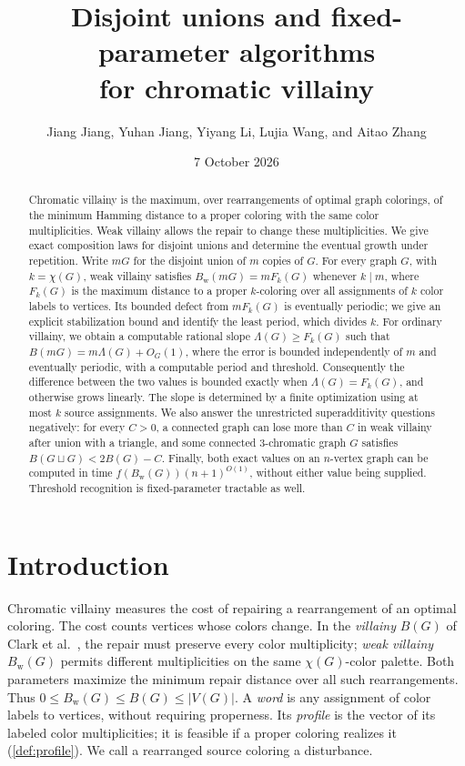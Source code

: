 \documentclass[11pt,reqno]{amsart}
\title[Chromatic villainy: unions and algorithms]{Disjoint unions and fixed-parameter algorithms\\for chromatic villainy}
\author[Jiang, Jiang, Li, Wang, and Zhang]{Jiang Jiang, Yuhan Jiang, Yiyang Li, Lujia Wang, and Aitao Zhang}
\date{7 October 2026}
\numberwithin{equation}{section}
\theoremstyle{definition}
\theoremstyle{remark}
\begin{document}
\begin{abstract}
Chromatic villainy is the maximum, over rearrangements of optimal
graph colorings, of the minimum Hamming distance to a proper coloring
with the same color multiplicities. Weak villainy allows the repair to
change these multiplicities. We give exact composition laws for
disjoint unions and determine the eventual growth under repetition.
Write $mG$ for the disjoint union of $m$ copies of $G$.
For every graph $G$, with $k=\chi(G)$, weak villainy satisfies
$B_{\mathrm w}(mG)=mF_k(G)$ whenever $k\mid m$, where $F_k(G)$ is
the maximum distance to a proper $k$-coloring over all assignments of
$k$ color labels to vertices. Its bounded defect from $mF_k(G)$ is eventually
periodic; we give an explicit stabilization bound and identify the
least period, which divides $k$. For ordinary villainy, we obtain a
computable rational slope $\Lambda(G)\ge F_k(G)$ such that
$B(mG)=m\Lambda(G)+O_G(1)$, where the error is bounded independently
of $m$ and eventually periodic, with a computable period and threshold.
Consequently the difference between the two
values is bounded exactly when $\Lambda(G)=F_k(G)$, and otherwise
grows linearly. The slope is determined by a finite optimization using
at most $k$ source assignments. We also answer the unrestricted
superadditivity questions negatively: for every $C>0$, a connected
graph can lose more than $C$ in weak villainy after union with a
triangle, and some connected $3$-chromatic graph $G$ satisfies
$B(G\sqcup G)<2B(G)-C$. Finally, both exact values on an $n$-vertex
graph can be computed in time $f(B_{\mathrm w}(G))(n+1)^{O(1)}$,
without either value being supplied. Threshold recognition is
fixed-parameter tractable as well.
\end{abstract}
\maketitle
\section{Introduction}

Chromatic villainy measures the cost of repairing a rearrangement of
an optimal coloring. The cost counts vertices whose colors change.
In the \emph{villainy} $B(G)$ of Clark et al.~\cite{clark2006},
the repair must preserve every color multiplicity; \emph{weak
villainy} $B_{\mathrm w}(G)$ permits different multiplicities on the
same $\chi(G)$-color palette. Both parameters maximize the minimum
repair distance over all such rearrangements. Thus
$0\le B_{\mathrm w}(G)\le B(G)\le |V(G)|$.
A \emph{word} is any assignment of color labels to vertices, without
requiring properness. Its \emph{profile} is the vector of its labeled color
multiplicities; it is feasible if a proper coloring realizes it
(\cref{def:profile}). We call a rearranged source coloring a disturbance.
\end{document}
